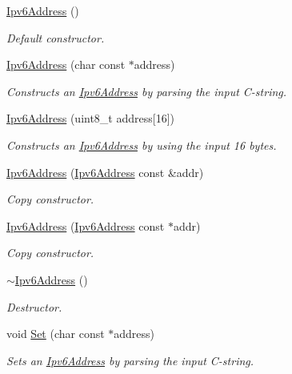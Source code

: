 \begin{DoxyCompactItemize}
\item 
\hyperlink{classns3_1_1Ipv6Address_aa844ddb3e107bf2364c4b858a125def4}{Ipv6\+Address} ()
\begin{DoxyCompactList}\small\item\em Default constructor. \end{DoxyCompactList}\item 
\hyperlink{classns3_1_1Ipv6Address_a3e20a4678816c9fe7d58c990010aeff6}{Ipv6\+Address} (char const $\ast$address)
\begin{DoxyCompactList}\small\item\em Constructs an \hyperlink{classns3_1_1Ipv6Address}{Ipv6\+Address} by parsing the input C-\/string. \end{DoxyCompactList}\item 
\hyperlink{classns3_1_1Ipv6Address_ab6416baf9b6f8daba1f739bca9ad1894}{Ipv6\+Address} (uint8\+\_\+t address\mbox{[}16\mbox{]})
\begin{DoxyCompactList}\small\item\em Constructs an \hyperlink{classns3_1_1Ipv6Address}{Ipv6\+Address} by using the input 16 bytes. \end{DoxyCompactList}\item 
\hyperlink{classns3_1_1Ipv6Address_ae8f93608144280a3a80c95f939bf4841}{Ipv6\+Address} (\hyperlink{classns3_1_1Ipv6Address}{Ipv6\+Address} const \&addr)
\begin{DoxyCompactList}\small\item\em Copy constructor. \end{DoxyCompactList}\item 
\hyperlink{classns3_1_1Ipv6Address_a9f3d7b5ea0031716d55100771e5ebc37}{Ipv6\+Address} (\hyperlink{classns3_1_1Ipv6Address}{Ipv6\+Address} const $\ast$addr)
\begin{DoxyCompactList}\small\item\em Copy constructor. \end{DoxyCompactList}\item 
\hyperlink{classns3_1_1Ipv6Address_a656ac5a7267854f9942f44c95842b1a4}{$\sim$\+Ipv6\+Address} ()
\begin{DoxyCompactList}\small\item\em Destructor. \end{DoxyCompactList}\item 
void \hyperlink{classns3_1_1Ipv6Address_aa5566a72cd0db41ef149a444977b6d7f}{Set} (char const $\ast$address)
\begin{DoxyCompactList}\small\item\em Sets an \hyperlink{classns3_1_1Ipv6Address}{Ipv6\+Address} by parsing the input C-\/string. \end{DoxyCompactList}\item 

\end{DoxyCompactItemize}
